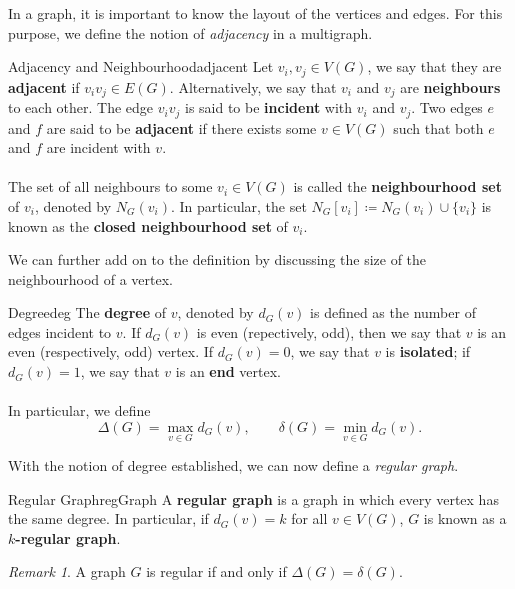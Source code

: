 \documentclass[math]{amznotes}
\theoremstyle{remark}
\newtheorem*{remark}{Remark}
\begin{document}
In a graph, it is important to know the layout of the vertices and edges. For this purpose, we define the notion of \textit{adjacency} in a multigraph.
\begin{dfnbox}{Adjacency and Neighbourhood}{adjacent}
    Let $v_i, v_j \in V(G)$, we say that they are {\color{red} \textbf{adjacent}} if $v_iv_j \in E(G)$. Alternatively, we say that $v_i$ and $v_j$ are {\color{red} \textbf{neighbours}} to each other. The edge $v_iv_j$ is said to be {\color{red} \textbf{incident}} with $v_i$ and $v_j$. Two edges $e$ and $f$ are said to be {\color{red} \textbf{adjacent}} if there exists some $v \in V(G)$ such that both $e$ and $f$ are incident with $v$. 
    \\\\
    The set of all neighbours to some $v_i \in V(G)$ is called the {\color{red} \textbf{neighbourhood set}} of $v_i$, denoted by $N_G(v_i)$. In particular, the set $N_G[v_i] \coloneqq N_G(v_i)\cup\{v_i\}$ is known as the {\color{red} \textbf{closed neighbourhood set}} of $v_i$.
\end{dfnbox}
We can further add on to the definition by discussing the size of the neighbourhood of a vertex.
\begin{dfnbox}{Degree}{deg}
    The {\color{red} \textbf{degree}} of $v$, denoted by $d_G(v)$ is defined as the number of edges incident to $v$. If $d_G(v)$ is even (repectively, odd), then we say that $v$ is an even (respectively, odd) vertex. If $d_G(v) = 0$, we say that $v$ is {\color{red} \textbf{isolated}}; if $d_G(v) = 1$, we say that $v$ is an {\color{red} \textbf{end}} vertex. 
    \\\\
    In particular, we define
    \begin{equation*}
        \Delta(G) = \max_{v \in G}d_G(v), \qquad \delta(G) = \min_{v \in G}d_G(v).
    \end{equation*}
\end{dfnbox}
With the notion of degree established, we can now define a \textit{regular graph}.
\begin{dfnbox}{Regular Graph}{regGraph}
    A {\color{red} \textbf{regular graph}} is a graph in which every vertex has the same degree. In particular, if $d_G(v) = k$ for all $v \in V(G)$, $G$ is known as a {\color{red} \textbf{$k$-regular graph}}.
\end{dfnbox}
\begin{notebox}
    \begin{remark}
        A graph $G$ is regular if and only if $\Delta(G) = \delta(G)$.
    \end{remark}
\end{notebox}
\end{document}
